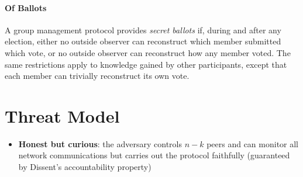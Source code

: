   \paragraph{Of Ballots}
  A group management protocol provides \emph{secret ballots} if, during and
  after any election, either no outside observer can reconstruct which member
  submitted which vote, or no outside observer can reconstruct how any
  member voted. The same restrictions apply to knowledge gained by other
  participants, except that each member can trivially reconstruct its own vote.

\section{Threat Model}
\begin{itemize}
\item \textbf{Honest but curious}: the adversary controls $n-k$ peers and
can monitor all network communications but carries out the protocol
faithfully (guaranteed by Dissent's accountability property)
\end{itemize}

